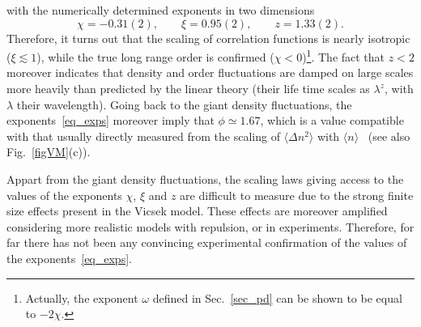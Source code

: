 with the numerically determined exponents in two dimensions
\begin{equation} \label{eq_exps}
\chi = -0.31(2) , \qquad \xi = 0.95 (2) , \qquad  z = 1.33(2) .
\end{equation}
Therefore, it turns out that the scaling of correlation functions is nearly isotropic ($\xi \lesssim 1$), 
while the true long range order is confirmed ($\chi < 0$)\footnote{Actually, the exponent $\omega$ defined in Sec.~\ref{sec_pd} can be shown to be equal to $-2\chi$.}.
The fact that $z< 2$ moreover indicates that density and order fluctuations are damped 
on large scales more heavily than predicted by the linear theory (their life time scales as $\lambda^z$, with $\lambda$ their wavelength).
Going back to the giant density fluctuations, the exponents~\eqref{eq_exps} moreover imply that $\phi \simeq 1.67$, 
which is a value compatible with that usually directly measured from the scaling of $\langle \Delta n^2\rangle$ with $\langle n \rangle$~\cite{chate2020dry,DADAM_LesHouches,geyer2018sounds,deseigne2012vibrated} (see also Fig.~\ref{figVM}(c)).
 
 Appart from the giant density fluctuations, the scaling laws giving access to the values of the exponents $\chi$, $\xi$ and $z$ are difficult to measure
 due to the strong finite size effects present in the Vicsek model. 
 These effects are moreover amplified considering more realistic models with repulsion, or in experiments.
 Therefore, for far there has not been any convincing experimental confirmation of the values of the exponents~\eqref{eq_exps}.
